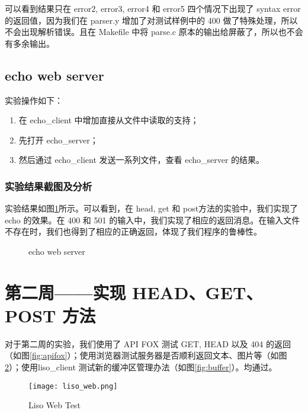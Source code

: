 可以看到结果只在 error2, error3, error4 和 error5 四个情况下出现了 syntax error 的返回值，因为我们在 parser.y 增加了对测试样例中的 400 做了特殊处理，所以不会出现解析错误。且在 Makefile 中将 parse.c 原本的输出给屏蔽了，所以也不会有多余输出。

\subsection{echo web server}

实验操作如下：
\begin{enumerate}
    \item 在 echo\_client 中增加直接从文件中读取的支持；
    \item 先打开 echo\_server；
    \item 然后通过 echo\_client 发送一系列文件，查看 echo\_server 的结果。
\end{enumerate}

\subsubsection*{实验结果截图及分析}
实验结果如图\ref{fig:echo web server}所示。可以看到，在 head, get 和 post方法的实验中，我们实现了 echo 的效果。在 400 和 501 的输入中，我们实现了相应的返回消息。在输入文件不存在时，我们也得到了相应的正确返回，体现了我们程序的鲁棒性。

\begin{figure}[htbp!]
    \centering
    \caption{echo web server}\label{fig:echo web server}
    \vspace{-1em}
\end{figure}

\section{第二周——实现 HEAD、GET、POST 方法}

对于第二周的实验，我们使用了 API FOX 测试 GET, HEAD 以及 404 的返回（如图\ref{fig:apifox}）；使用浏览器测试服务器是否顺利返回文本、图片等（如图\ref{fig:web}）；使用liso\_client 测试新的缓冲区管理办法（如图\ref{fig:buffer}）。均通过。

\begin{figure}[htbp!]
    \centering
    \texttt{[image: liso\_web.png]}
    \caption{Liso Web Test}\label{fig:web}
\end{figure}

